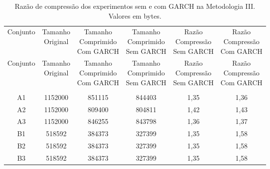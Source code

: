 \begin{center}
\begin{longtable}{cccccc}
\toprule
\rowcolor{white}
\caption[Metodologia III: Razão de compressão]{Razão de compressão dos
experimentos sem e com GARCH na Metodologia III.
Valores em bytes.} \label{Tab:razaocompressaoMet3} \\
\midrule
Conjunto & \specialcell{Tamanho \\Original} & \specialcell{Tamanho
\\Comprimido\\Com GARCH} & \specialcell{Tamanho
\\Comprimido\\Sem GARCH} & \specialcell{Razão \\Compressão
\\Sem GARCH} & \specialcell{Razão \\Compressão
\\Com GARCH} \\
\midrule
\endfirsthead
\midrule
\rowcolor{white}
Conjunto & \specialcell{Tamanho \\Original} & \specialcell{Tamanho
\\Comprimido\\Com GARCH} & \specialcell{Tamanho
\\Comprimido\\Sem GARCH} & \specialcell{Razão \\Compressão
\\Sem GARCH} & \specialcell{Razão \\Compressão
\\Com GARCH} \\
\toprule
\endhead
\midrule \\ %
\endfoot
\bottomrule
\endlastfoot
    A1    & 1152000 & 851115 & 844403 & 1,35  & 1,36 \\
    A2    & 1152000 & 809400 & 804811 & 1,42  & 1,43 \\
    A3    & 1152000 & 846255 & 843798 & 1,36  & 1,37 \\
    B1    & 518592 & 384373 & 327399 & 1,35  & 1,58 \\
    B2    & 518592 & 384373 & 327399 & 1,35  & 1,58 \\
    B3    & 518592 & 384373 & 327399 & 1,35  & 1,58 \\

\end{longtable}
\end{center}
